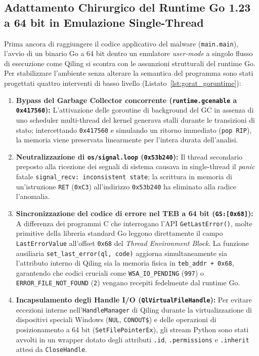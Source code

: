 \documentclass[11pt, a4paper]{article}
\begin{document}
\subsection{Adattamento Chirurgico del Runtime Go 1.23 a 64 bit in Emulazione Single-Thread}

Prima ancora di raggiungere il codice applicativo del malware (\texttt{main.main}), l'avvio di un binario Go a 64 bit dentro un emulatore \textit{user-mode} a singolo flusso di esecuzione come Qiling si scontra con le assunzioni strutturali del runtime Go. Per stabilizzare l'ambiente senza alterare la semantica del programma sono stati progettati quattro interventi di basso livello (Listato~\ref{lst:gorat_goruntime}):

\begin{enumerate}
	\item \textbf{Bypass del Garbage Collector concorrente (\texttt{runtime.\allowbreak{}gcenable} a \texttt{0x417560}):} L'attivazione delle goroutine di background del GC in assenza di uno scheduler multi-thread del kernel generava stalli durante le transizioni di stato; intercettando \texttt{0x417560} e simulando un ritorno immediato (\texttt{pop RIP}), la memoria viene preservata linearmente per l'intera durata dell'analisi.
	\item \textbf{Neutralizzazione di \texttt{os/\allowbreak{}signal.\allowbreak{}loop} (\texttt{0x53b240}):} Il thread secondario preposto alla ricezione dei segnali di sistema causava in single-thread il \textit{panic} fatale \texttt{signal\_\allowbreak{}recv: inconsistent state}; la scrittura in memoria di un'istruzione \texttt{RET} (\texttt{0xC3}) all'indirizzo \texttt{0x53b240} ha eliminato alla radice l'anomalia.
	\item \textbf{Sincronizzazione del codice di errore nel TEB a 64 bit (\texttt{GS:[0x68]}):} A differenza dei programmi C che interrogano l'API \texttt{Get\allowbreak{}Last\allowbreak{}Error()}, molte primitive della libreria standard Go leggono direttamente il campo \texttt{Last\allowbreak{}Error\allowbreak{}Value} all'offset \texttt{0x68} del \textit{Thread Environment Block}. La funzione ausiliaria \texttt{set\_\allowbreak{}last\_\allowbreak{}error(ql, code)} aggiorna simultaneamente sia l'attributo interno di Qiling sia la memoria fisica in \texttt{teb\_\allowbreak{}addr + 0x68}, garantendo che codici cruciali come \texttt{WSA\_\allowbreak{}IO\_\allowbreak{}PENDING} (\texttt{997}) o \texttt{ERROR\_\allowbreak{}FILE\_\allowbreak{}NOT\_\allowbreak{}FOUND} (\texttt{2}) vengano recepiti fedelmente dal runtime Go.
	\item \textbf{Incapsulamento degli Handle I/O (\texttt{Ql\allowbreak{}Virtual\allowbreak{}File\allowbreak{}Handle}):} Per evitare eccezioni interne nell'\texttt{Handle\allowbreak{}Manager} di Qiling durante la virtualizzazione di dispositivi speciali Windows (\texttt{NUL}, \texttt{CONOUT\$}) e delle operazioni di posizionamento a 64 bit (\texttt{Set\allowbreak{}File\allowbreak{}Pointer\allowbreak{}Ex}), gli stream Python sono stati avvolti in un wrapper dotato degli attributi \texttt{.id}, \texttt{.permissions} e \texttt{.inherit} attesi da \texttt{CloseHandle}.
\end{enumerate}
\end{document}
